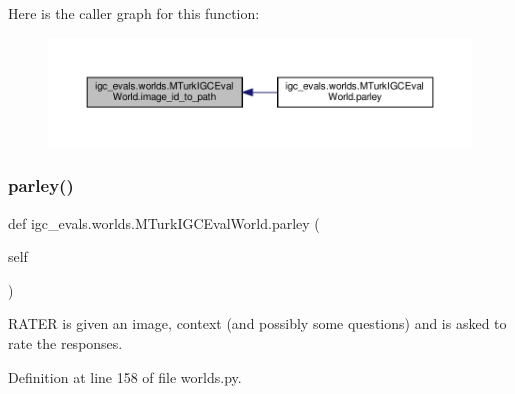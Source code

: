 Here is the caller graph for this function\+:
\nopagebreak
\begin{figure}[H]
\begin{center}
\leavevmode
\includegraphics[width=350pt]{classigc__evals_1_1worlds_1_1MTurkIGCEvalWorld_af15ae6901cfd80ff6b3253294f0f46c6_icgraph}
\end{center}
\end{figure}
\mbox{\label{classigc__evals_1_1worlds_1_1MTurkIGCEvalWorld_ab2ddf25bf050e7f12d675dc910c04a3d}} 
\subsubsection{\texorpdfstring{parley()}{parley()}}
{\footnotesize\ttfamily def igc\+\_\+evals.\+worlds.\+M\+Turk\+I\+G\+C\+Eval\+World.\+parley (\begin{DoxyParamCaption}\item[{}]{self }\end{DoxyParamCaption})}

\begin{DoxyVerb}RATER is given an image, context (and possibly some questions)
   and is asked to rate the responses.
\end{DoxyVerb}
 

Definition at line 158 of file worlds.\+py.



